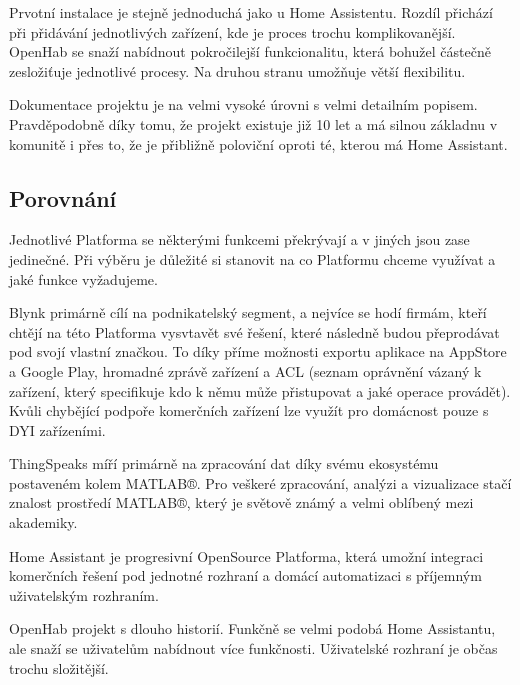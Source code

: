 \documentclass[thesis=B,czech]{FITthesis}[2019/12/23]
\begin{document}
Prvotní instalace je stejně jednoduchá jako u Home Assistentu. Rozdíl přichází při přidávání jednotlivých zařízení, kde je proces trochu komplikovanější. OpenHab se snaží nabídnout pokročilejší funkcionalitu, která bohužel částečně zesložiťuje jednotlivé procesy. Na druhou stranu umožňuje větší flexibilitu.

Dokumentace projektu je na velmi vysoké úrovni s velmi detailním popisem. Pravděpodobně díky tomu, že projekt existuje již 10 let a má silnou základnu v komunitě i přes to, že je přibližně poloviční oproti té, kterou má Home Assistant.

\subsection{Porovnání}
Jednotlivé Platforma se některými funkcemi překrývají a v jiných jsou zase jedinečné. Při výběru je důležité si stanovit na co Platformu chceme využívat a jaké funkce vyžadujeme.

Blynk primárně cílí na podnikatelský segment, a nejvíce se hodí firmám, kteří chtějí na této Platforma vysvtavět své řešení, které následně budou přeprodávat pod svojí vlastní značkou. To díky příme možnosti exportu aplikace na AppStore a Google Play, hromadné zprávě zařízení a ACL (seznam oprávnění vázaný k zařízení, který specifikuje kdo k němu může přistupovat a jaké operace provádět). Kvůli chybějící podpoře komerčních zařízení lze využít pro domácnost pouze s DYI zařízeními.

ThingSpeaks míří primárně na zpracování dat díky svému ekosystému postaveném kolem MATLAB®. Pro veškeré zpracování, analýzi a vizualizace stačí znalost prostředí MATLAB®, který je světově známý a velmi oblíbený mezi akademiky.

Home Assistant je progresivní OpenSource Platforma, která umožní integraci komerčních řešení pod jednotné rozhraní a domácí automatizaci s příjemným uživatelským rozhraním.

OpenHab projekt s dlouho historií. Funkčně se velmi podobá Home Assistantu, ale snaží se uživatelům nabídnout více funkčnosti. Uživatelské rozhraní je občas trochu složitější.
\end{document}
